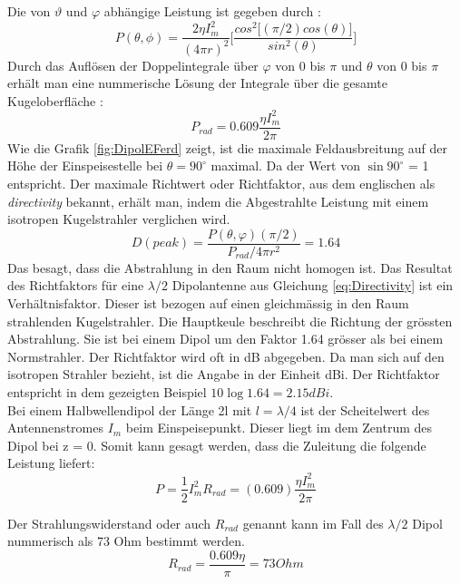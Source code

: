 Die von $\vartheta$ und $\varphi$ abhängige Leistung ist gegeben durch \cite{elliott1981antenna}:
\begin{equation}
P(\theta,\phi)=\frac{2\eta I_{m}^{2}}{(4\pi r)^{2}}\lbrack \frac{cos^{2}\lbrack (\pi/2) cos(\theta)\rbrack}{sin^{2}(\theta)}\rbrack
\end{equation}
Durch das Auflösen der Doppelintegrale über $\varphi$ von 0 bis $\pi$  und $\theta$ von 0 bis $\pi$ erhält man eine nummerische Lösung der Integrale über die gesamte Kugeloberfläche \cite{elliott1981antenna}:
\begin{equation}
P_{rad}=0.609 \frac{\eta I_{m}^{2}}{2\pi}
\end{equation}
Wie die  Grafik \ref{fig:DipolEFerd} zeigt, ist die maximale Feldausbreitung auf der Höhe der Einspeisestelle bei $\theta = 90 ^\circ $ maximal.  Da der Wert von  $\sin90^\circ  $ = 1 entspricht.
Der maximale Richtwert oder Richtfaktor,  aus dem englischen als \textit{directivity} bekannt, erhält man, indem die Abgestrahlte Leistung mit einem isotropen Kugelstrahler verglichen wird\cite{elliott1981antenna}.
\begin{equation}
D(peak)=\frac{P(\theta,\varphi)(\pi/2)}{P_{rad}/ 4 \pi r^{2}} =1.64
\label{eq:Directivity}
\end{equation}
Das besagt, dass die Abstrahlung in den Raum nicht homogen ist. Das Resultat des Richtfaktors für eine $\lambda /2$ Dipolantenne aus Gleichung \ref{eq:Directivity} ist ein Verhältnisfaktor. Dieser ist bezogen auf einen gleichmässig in den Raum strahlenden Kugelstrahler. Die Hauptkeule beschreibt die Richtung der grössten Abstrahlung. Sie ist bei einem Dipol um den Faktor 1.64 grösser als bei einem Normstrahler. Der Richtfaktor wird oft in dB abgegeben. Da man sich auf den isotropen Strahler bezieht, ist die Angabe in der Einheit dBi. Der Richtfaktor entspricht in dem gezeigten Beispiel $10\log{1.64}=2.15dBi$.\\

Bei einem Halbwellendipol der Länge 2l mit $l=\lambda/4 $ ist der Scheitelwert des Antennenstromes $I_{m}$ beim Einspeisepunkt. Dieser liegt im dem Zentrum des Dipol bei z = 0. Somit kann gesagt werden, dass die Zuleitung  die folgende Leistung  liefert:
\begin{equation}
P=\frac{1}{2} I_{m}^{2}R_{rad}=(0.609)\frac{\eta I_{m}^{2}}{2\pi}
\end{equation}

Der Strahlungswiderstand oder auch $R_{rad}$ genannt kann im Fall des $\lambda /2$ Dipol nummerisch als 73 Ohm bestimmt werden.
\begin{equation}\label{RradDipol}
R_{rad}=\frac{0.609 \eta}{\pi}= 73 Ohm
\end{equation}
